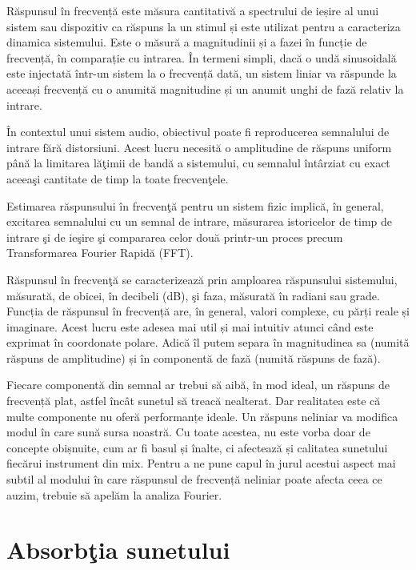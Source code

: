 	Răspunsul în frecvență este măsura cantitativă a spectrului de ieșire al unui sistem sau dispozitiv ca răspuns la un stimul și este utilizat pentru a caracteriza dinamica sistemului. Este o măsură a magnitudinii și a fazei în funcție de frecvență, în comparație cu intrarea. În termeni simpli, dacă o undă sinusoidală este injectată într-un sistem la o frecvență dată, un sistem liniar va răspunde la aceeași frecvență cu o anumită magnitudine și un anumit unghi de fază relativ la intrare.	 
	
	\^{I}n contextul unui sistem audio, obiectivul poate fi reproducerea semnalului de intrare f\u{a}r\u{a} distorsiuni. Acest lucru necesit\u{a} o amplitudine de r\u{a}spuns uniform p\^{a}n\u{a} la limitarea l\u{a}\c{t}imii de band\u{a} a sistemului, cu semnalul \^{i}nt\^{a}rziat cu exact aceea\c{s}i cantitate de timp la toate frecven\c{t}ele.	 
	
	Estimarea r\u{a}spunsului \^{i}n frecven\c{t}\u{a} pentru un sistem fizic implic\u{a}, \^{i}n general, excitarea semnalului cu un semnal de intrare, m\u{a}surarea istoricelor de timp de intrare \c{s}i de ie\c{s}ire \c{s}i compararea celor dou\u{a} printr-un proces precum Transformarea Fourier Rapid\u{a} (FFT).
	
	R\u{a}spunsul \^{i}n frecven\c{t}\u{a} se caracterizeaz\u{a} prin amploarea r\u{a}spunsului sistemului, m\u{a}sur\-at\u{a}, de obicei, \^{i}n decibeli (dB), \c{s}i faza, m\u{a}surat\u{a} \^{i}n radiani sau grade. Funcția de răspunsul în frecvență are, în general, valori complexe, cu părți reale și imaginare. Acest lucru este adesea mai util și mai intuitiv atunci când este exprimat în coordonate polare. Adică îl putem separa în magnitudinea sa (numită răspuns de amplitudine) și în componentă de fază (numită răspuns de fază).
	
	Fiecare componentă din semnal ar trebui să aibă, în mod ideal, un răspuns de frecvență plat, astfel încât sunetul să treacă nealterat. Dar realitatea este că multe componente nu oferă performanțe ideale. Un răspuns neliniar va modifica modul în care sună sursa noastră. Cu toate acestea, nu este vorba doar de concepte obișnuite, cum ar fi basul și înalte, ci afectează și calitatea sunetului fiecărui instrument din mix. Pentru a ne pune capul în jurul acestui aspect mai subtil al modului în care răspunsul de frecvență neliniar poate afecta ceea ce auzim, trebuie să apelăm la analiza Fourier.
	
	\section{Absorb\c{t}ia sunetului}
	

